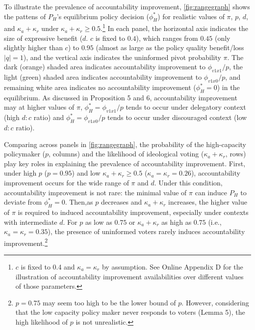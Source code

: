 \documentclass[letterpaper, 12pt]{article}
\begin{document}
    \par To illustrate the prevalence of accountability improvement, \autoref{fig:rangegraph} shows the pattens of $P_H$'s equilibrium policy decision ($\phi^*_H$) for realistic values of $\pi$, $p$, $d$, and $\kappa_a + \kappa_r$ under $\kappa_a + \kappa_r\geq0.5$.\footnote{$c$ is fixed to 0.4 and $\kappa_a=\kappa_r$ by assumption. See Online Appendix D for the illustration of accountability improvement availabilities over different values of those parameters.} In each panel, the horizontal axis indicates the size of expressive benefit ($d$. $c$ is fixed to $0.4$), which ranges from $0.45$ (only slightly higher than $c$) to $0.95$ (almost as large as the policy quality benefit/loss $|q|=1$), and the vertical axis indicates the uninformed pivot probability $\pi$. The dark (orange) shaded area indicates accountability improvement to $\phi_{v1x1}/p$, the light (green) shaded area indicates accountability improvement to $\phi_{v1x0}/p$, and remaining white area indicates no accountability improvement ($\phi^*_{H}=0$) in the equilibrium. As discussed in Proposition 5 and 6, accountability improvement may at higher values of $\pi$, $\phi^*_H=\phi_{v1x1}/p$ tends to occur under delegatory context (high $d:c$ ratio) and $\phi^*_H=\phi_{v1x0}/p$ tends to occur under discouraged context (low $d:c$ ratio).

    \par Comparing across panels in \autoref{fig:rangegraph}, the probability of the high-capacity policymaker ($p$, columns) and the likelihood of ideological voting ($\kappa_a+\kappa_r$, rows) play key roles in explaining the prevalence of accountability improvement. First, under high $p$ ($p=0.95$) and low $\kappa_a + \kappa_r \geq 0.5$ ($\kappa_a=\kappa_r=0.26$), accountability improvement occurs for the wide range of $\pi$ and $d$. Under this condition, accountability improvement is not rare: the minimal value of $\pi$ can induce $P_H$ to deviate from $\phi^*_H=0$. Then,as $p$ decreases and $\kappa_a + \kappa_r$ increases, the higher value of $\pi$ is required to induced accountability improvement, especially under contexts with intermediate $d$. For $p$ as low as $0.75$ or $\kappa_a+\kappa_r$ as high as $0.75$ (i.e., $\kappa_a=\kappa_r=0.35$), the presence of uninformed voters rarely induces accountability improvement.\footnote{$p=0.75$ may seem too high to be the lower bound of $p$. However, considering that the low capacity policy maker never responds to voters (Lemma 5), the high likelihood of $p$ is not unrealistic.}
\end{document}

